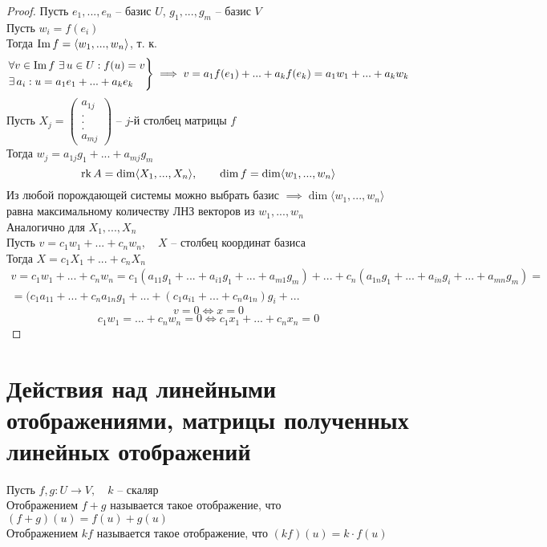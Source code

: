 \begin{proof}
	Пусть $ e_1, ..., e_n $ -- базис $ U $, $ g_1, ..., g_m $ -- базис $ V $ \\
    Пусть $ w_i = f(e_i) $ \\
    Тогда $ \operatorname{Im} f = \langle w_1, ..., w_n \rangle $, т. к.
    $$
    \begin{rcases}
    	\forall v \in \operatorname{Im} f ~ \exists\, u \in U : f(u) = v \\
        \exists\, a_i : u = a_1e_1 + ... + a_ke_k
    \end{rcases} \implies v = a_1f(e_1) + ... + a_kf(e_k) = a_1w_1 + ... + a_kw_k $$
    Пусть $ X_j =
    \begin{pmatrix}
        a_{1j} \\
        . \\
        . \\
        . \\
        a_{mj}
    \end{pmatrix} $ -- $j$-й столбец матрицы $ f $ \\
    Тогда $ w_j = a_{1j}g_1 + ... + a_{mj}g_m $
    $$ \operatorname{rk} A = \dim \langle X_1, ..., X_n \rangle, \qquad \dim f = \dim \langle w_1, ..., w_n \rangle $$
    Из любой порождающей системы можно выбрать базис $ \implies \dim \langle w_1, ..., w_n \rangle $ равна максимальному количеству ЛНЗ векторов из $ w_1, ..., w_n $ \\
    Аналогично для $ X_1, ..., X_n $ \\
    Пусть $ v = c_1w_1 + ... + c_nw_n, \quad X $ -- столбец координат базиса \\
    Тогда $ X = c_1X_1 + ... + c_nX_n $
    \begin{multline*}
        v = c_1w_1 + ... + c_nw_n = c_1(a_{11}g_1 + ... + a_{i1}g_1 + ... + a_{m1}g_m) + ... + c_n(a_{1n}g_1 + ... + a_{in}g_i + ... + a_{mn}g_m) = \\ = (c_1a_{11} + ... + c_na_{1n}g_1 + ... + (c_1a_{i1} + ... + c_na_{1n})g_i + ...
    \end{multline*}
    $$ v = 0 \iff x = 0 $$
    $$ c_1w_1 = ... + c_nw_n = 0 \iff c_1x_1 + ... + c_nx_n = 0 $$
\end{proof}

\section{Действия над линейными отображениями, матрицы полученных линейных отображений}

\begin{definition}
	Пусть $ f, g : U \to V, \quad k $ -- скаляр \\
    Отображением $ f + g $ называется такое отображение, что $ (f + g)(u) = f(u) + g(u) $ \\
    Отображением $ kf $ называется такое отображение, что $ (kf)(u) = k \cdot f(u) $
\end{definition}

